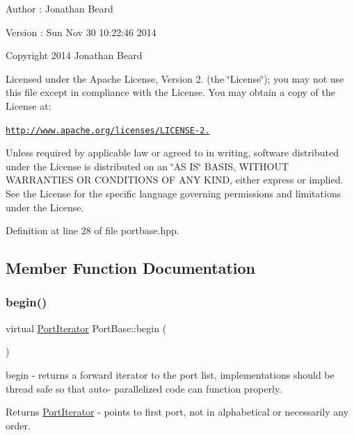 \begin{DoxyAuthor}{Author}
\+: Jonathan Beard 
\end{DoxyAuthor}
\begin{DoxyVersion}{Version}
\+: Sun Nov 30 10\+:22\+:46 2014
\end{DoxyVersion}
Copyright 2014 Jonathan Beard

Licensed under the Apache License, Version 2. (the \char`\"{}\+License\char`\"{}); you may not use this file except in compliance with the License. You may obtain a copy of the License at\+:

\href{http://www.apache.org/licenses/LICENSE-2.0}{\tt http\+://www.\+apache.\+org/licenses/\+L\+I\+C\+E\+N\+S\+E-\/2.}

Unless required by applicable law or agreed to in writing, software distributed under the License is distributed on an \char`\"{}\+A\+S I\+S\char`\"{} B\+A\+S\+IS, W\+I\+T\+H\+O\+UT W\+A\+R\+R\+A\+N\+T\+I\+ES OR C\+O\+N\+D\+I\+T\+I\+O\+NS OF A\+NY K\+I\+ND, either express or implied. See the License for the specific language governing permissions and limitations under the License. 

Definition at line 28 of file portbase.\+hpp.



\subsection{Member Function Documentation}
\hypertarget{class_port_base_afc54c92e3b9d1967e8a8c7e74d7507d3}{}\label{class_port_base_afc54c92e3b9d1967e8a8c7e74d7507d3} 
\subsubsection{\texorpdfstring{begin()}{begin()}}
{\footnotesize\ttfamily virtual \hyperlink{class_port_iterator}{Port\+Iterator} Port\+Base\+::begin (\begin{DoxyParamCaption}{ }\end{DoxyParamCaption})\hspace{0.3cm}{\ttfamily [pure virtual]}}

begin -\/ returns a forward iterator to the port list, implementations should be thread safe so that auto-\/ parallelized code can function properly. \begin{DoxyReturn}{Returns}
\hyperlink{class_port_iterator}{Port\+Iterator} -\/ points to first port, not in alphabetical or necessarily any order. 
\end{DoxyReturn}


